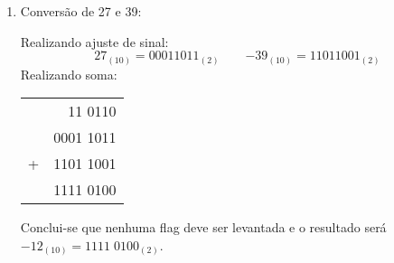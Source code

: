 \documentclass{article}
\begin{document}
\begin{resolution}
\begin{enumerate}
                    \item Conversão de 27 e 39:
                        \begin{figure}[H]
                            \centering
                        \end{figure}
                    Realizando ajuste de sinal:
                        \begin{equation*}
                            \boxed{ 27_{(10)} = 00011011_{(2)}}
                            \qquad
                            \boxed{-39_{(10)} = 11011001_{(2)}}
                        \end{equation*}
                    Realizando soma:
                        \begin{table}[H]
                            \centering  
                            \begin{tabular}[]{cr}
                                  &   11 0110\\
                                  & 0001 1011\\
                                + & 1101 1001\\\hline
                                  & 1111 0100\\
                            \end{tabular}
                        \end{table}
                    Conclui-se que nenhuma flag deve ser levantada e o resultado será $\boxed{-12_{(10)} = 1111\;0100_{(2)}}$.
\newpage


\end{enumerate}
\end{resolution}
\end{document}
